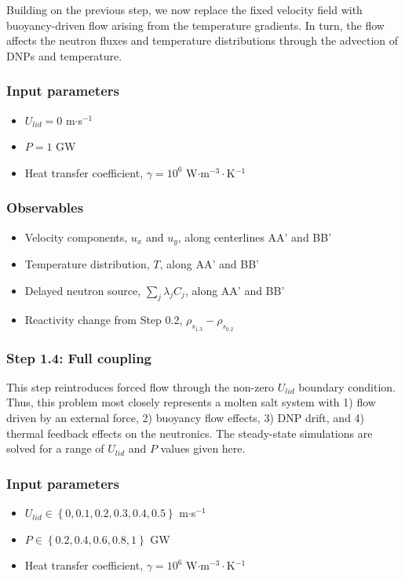 Building on the previous step, we now replace the fixed velocity field with
buoyancy-driven flow arising from the temperature gradients. In turn, the flow
affects the neutron fluxes and temperature distributions through the advection
of \glspl{DNP} and temperature.

\subsubsection*{Input parameters}
\begin{itemize}
    \item $U_{lid} = 0$ m$\cdot$s$^{-1}$
    \item $P = 1$ GW
    \item Heat transfer coefficient, $\gamma = 10^6$ W$\cdot$m$^{-3}\cdot$K$^{-1}$
\end{itemize}
%
\subsubsection*{Observables}
\begin{itemize}
    \item Velocity components, $u_x$ and $u_y$, along centerlines AA' and BB'
    \item Temperature distribution, $T$, along AA' and BB'
    \item Delayed neutron source, $\sum_j \lambda_j C_j$, along AA' and BB'
    \item Reactivity change from Step 0.2, $\rho_{s_{1.3}} - \rho_{s_{0.2}}$
\end{itemize}

\subsubsection{Step 1.4: Full coupling}

This step reintroduces forced flow through the non-zero $U_{lid}$ boundary
condition. Thus, this problem most closely represents a molten salt system with
1) flow driven by an external force, 2) buoyancy flow effects, 3) \gls{DNP}
drift, and 4) thermal feedback effects on the neutronics. The steady-state
simulations are solved for a range of $U_{lid}$ and $P$ values given here.

\subsubsection*{Input parameters}
\begin{itemize}
    \item $U_{lid} \in \left\lbrace 0, 0.1, 0.2, 0.3, 0.4, 0.5 \right\rbrace $ m$\cdot$s$^{-1}$
    \item $P \in \left\lbrace 0.2, 0.4, 0.6, 0.8, 1 \right\rbrace $ GW
    \item Heat transfer coefficient, $\gamma = 10^6$ W$\cdot$m$^{-3}\cdot$K$^{-1}$
\end{itemize}
%
